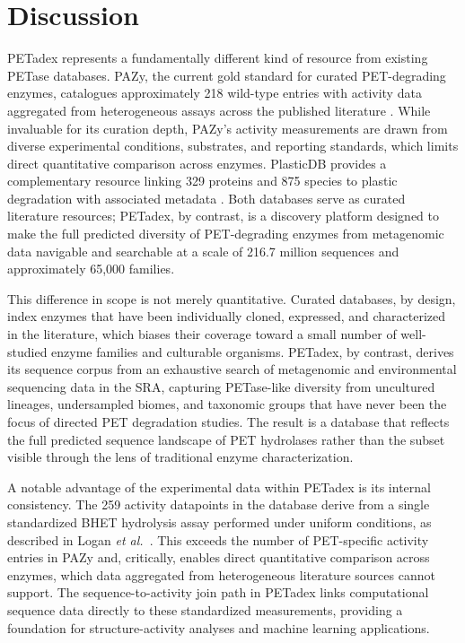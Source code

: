 \documentclass[unnumsec,webpdf,modern,large]{oup-authoring-template}
\begin{document}
\section{Discussion}

PETadex represents a fundamentally different kind of resource from existing PETase databases. PAZy, the current gold standard for curated PET-degrading enzymes, catalogues approximately 218 wild-type entries with activity data aggregated from heterogeneous assays across the published literature \citep{buchholz_plastics_2022}. While invaluable for its curation depth, PAZy's activity measurements are drawn from diverse experimental conditions, substrates, and reporting standards, which limits direct quantitative comparison across enzymes. PlasticDB provides a complementary resource linking 329 proteins and 875 species to plastic degradation with associated metadata \citep{gambarini_plasticdb_2022}. Both databases serve as curated literature resources; PETadex, by contrast, is a discovery platform designed to make the full predicted diversity of PET-degrading enzymes from metagenomic data navigable and searchable at a scale of 216.7 million sequences and approximately 65,000 families.

This difference in scope is not merely quantitative. Curated databases, by design, index enzymes that have been individually cloned, expressed, and characterized in the literature, which biases their coverage toward a small number of well-studied enzyme families and culturable organisms. PETadex, by contrast, derives its sequence corpus from an exhaustive search of metagenomic and environmental sequencing data in the SRA, capturing PETase-like diversity from uncultured lineages, undersampled biomes, and taxonomic groups that have never been the focus of directed PET degradation studies. The result is a database that reflects the full predicted sequence landscape of PET hydrolases rather than the subset visible through the lens of traditional enzyme characterization.

A notable advantage of the experimental data within PETadex is its internal consistency. The 259 activity datapoints in the database derive from a single standardized BHET hydrolysis assay performed under uniform conditions, as described in Logan \textit{et al.}\ \citep{chikhi_logan_2025}. This exceeds the number of PET-specific activity entries in PAZy and, critically, enables direct quantitative comparison across enzymes, which data aggregated from heterogeneous literature sources cannot support. The sequence-to-activity join path in PETadex links computational sequence data directly to these standardized measurements, providing a foundation for structure-activity analyses and machine learning applications.
\end{document}

